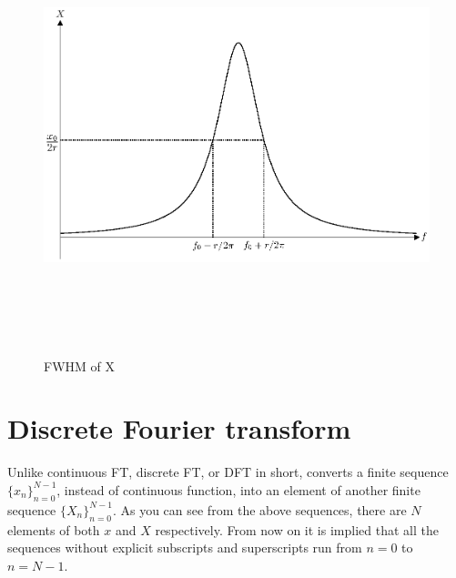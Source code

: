 \documentclass[letterpaper, 11pt]{article}
\numberwithin{equation}{section}
\numberwithin{figure}{section}
\numberwithin{table}{section}
\begin{document}
\begin{figure}[H]
	\centering
	\includegraphics[height=5in]{FWHM.eps}
	\caption{FWHM of X}
	\label{fig4}
\end{figure}

\clearpage

\section{Discrete Fourier transform}
Unlike continuous FT, discrete FT, or DFT in short, converts a finite sequence \(\{x_{n}\}_{n=0}^{N-1} \), instead of continuous function, into an element of another finite sequence \( \{X_{n}\}_{n=0}^{N-1} \). As you can see from the above sequences, there are \(N\) elements of both \(x\) and \(X\) respectively. From now on it is implied that all the sequences without explicit subscripts and superscripts run from \(n=0\) to \(n=N-1\).   

\end{document}
